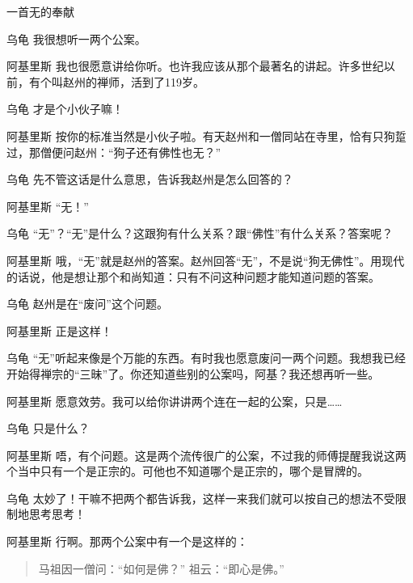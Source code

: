 \begin{dialog}{一首无的奉献\label{abcd}}
\begin{dialogue}
\item[乌龟]我很想听一两个公案。

\item[阿基里斯]我也很愿意讲给你听。也许我应该从那个最著名的讲起。许多世纪以前，有个叫赵州的禅师，活到了119岁。

\item[乌龟]才是个小伙子嘛！

\item[阿基里斯]按你的标准当然是小伙子啦。有天赵州和一僧同站在寺里，恰有只狗踅过，那僧便问赵州：“狗子还有佛性也无？”

\item[乌龟]先不管这话是什么意思，告诉我赵州是怎么回答的？

\item[阿基里斯]“无！”

\item[乌龟]“无”？“无”是什么？这跟狗有什么关系？跟“佛性”有什么关系？答案呢？

\item[阿基里斯]哦，“无”就是赵州的答案。赵州回答“无”，不是说“狗无佛性”。用现代的话说，他是想让那个和尚知道：只有不问这种问题才能知道问题的答案。

\item[乌龟]赵州是在“废问”这个问题。

\item[阿基里斯]正是这样！

\item[乌龟]“无”听起来像是个万能的东西。有时我也愿意废问一两个问题。我想我已经开始得禅宗的“三昧”了。你还知道些别的公案吗，阿基？我还想再听一些。

\item[阿基里斯]愿意效劳。我可以给你讲讲两个连在一起的公案，只是……

\item[乌龟]只是什么？

\item[阿基里斯]唔，有个问题。这是两个流传很广的公案，不过我的师傅提醒我说这两个当中只有一个是正宗的。可他也不知道哪个是正宗的，哪个是冒牌的。

\item[乌龟]太妙了！干嘛不把两个都告诉我，这样一来我们就可以按自己的想法不受限制地思考思考！

\item[阿基里斯]行啊。那两个公案中有一个是这样的：
\begin{quote}
马祖因一僧问：“如何是佛？”
祖云：“即心是佛。”
\end{quote}


\end{dialogue}
\end{dialog}
